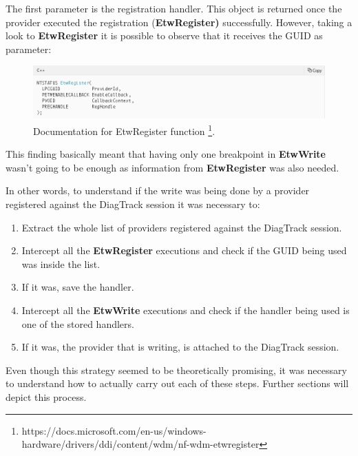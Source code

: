 The first parameter is the registration handler. This object is returned once the provider executed the registration ({\bfseries EtwRegister)} successfully.
However, taking a look to {\bfseries EtwRegister} it is possible to observe that it receives the GUID as parameter:
\begin{figure}[H]
  \includegraphics[width=\linewidth]{images/etw_register_docu.png}
  \caption[]{Documentation for EtwRegister function \footnote{https://docs.microsoft.com/en-us/windows-hardware/drivers/ddi/content/wdm/nf-wdm-etwregister}.}
  \label{fig:etw_register_docu}
\end{figure}

This finding basically meant that having only one breakpoint in {\bfseries EtwWrite} wasn't going to be enough as information from {\bfseries EtwRegister} was also needed.

In other words, to understand if the write was being done by a provider registered against the DiagTrack session it was necessary to: 
\begin{enumerate}
\setlength\itemsep{0.05em}
    \item Extract the whole list of providers registered against the DiagTrack session.
    \item Intercept all the {\bfseries EtwRegister} executions and check if the GUID being used was inside the list.
    \item If it was, save the handler. 
    \item Intercept all the {\bfseries EtwWrite} executions and check if the handler being used is one of the stored handlers.
    \item If it was, the provider that is writing, is attached to the DiagTrack session.
\end{enumerate}

Even though this strategy seemed to be theoretically promising, it was necessary to understand how to actually carry out each of these steps. Further sections will depict this process.






